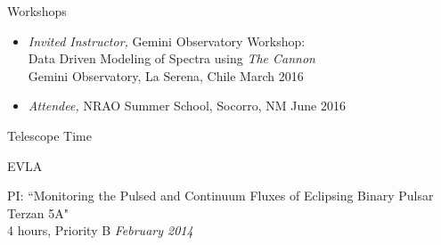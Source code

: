 \documentclass{resume} %
\begin{document}
\begin{rSection}{Workshops}

  \begin{itemize}

    \item 
      \emph{Invited Instructor,} Gemini Observatory Workshop: \\
      Data Driven Modeling of Spectra using \emph{The Cannon} \\
      Gemini Observatory, La Serena, Chile \hfill March 2016
    \item
      \emph{Attendee,} NRAO Summer School, Socorro, NM \hfill June 2016 

  \end{itemize}


\end{rSection}



\begin{rSection}{Telescope Time}

\begin{rSubsection}{EVLA}{}{}{}
\item PI: ``Monitoring the Pulsed and Continuum Fluxes of Eclipsing Binary Pulsar Terzan 5A" \\
4 hours, Priority B \hfill {\em February 2014}
\end{rSubsection}

\end{rSection}

\end{document}
